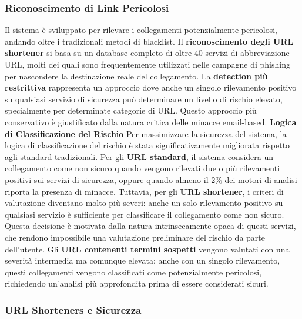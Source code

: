 \documentclass{article}
\begin{document}
\subsubsection{Riconoscimento di Link Pericolosi}

Il sistema è sviluppato per rilevare i collegamenti potenzialmente pericolosi, andando oltre i tradizionali metodi di blacklist. Il \textbf{riconoscimento degli URL shortener} si basa su un database completo di oltre 40 servizi di abbreviazione URL, molti dei quali sono frequentemente utilizzati nelle campagne di phishing per nascondere la destinazione reale del collegamento.
\newline \newline
La \textbf{detection più restrittiva} rappresenta un approccio dove anche un singolo rilevamento positivo su qualsiasi servizio di sicurezza può determinare un livello di rischio elevato, specialmente per determinate categorie di URL. Questo approccio più conservativo è giustificato dalla natura critica delle minacce email-based.
\newline \newline
\textbf{Logica di Classificazione del Rischio}
\newline
Per massimizzare la sicurezza del sistema, la logica di classificazione del rischio è stata significativamente migliorata rispetto agli standard tradizionali. Per gli \textbf{URL standard}, il sistema considera un collegamento come non sicuro quando vengono rilevati due o più rilevamenti positivi sui servizi di sicurezza, oppure quando almeno il 2\% dei motori di analisi riporta la presenza di minacce.
\newline \newline
Tuttavia, per gli \textbf{URL shortener}, i criteri di valutazione diventano molto più severi: anche un solo rilevamento positivo su qualsiasi servizio è sufficiente per classificare il collegamento come non sicuro. Questa decisione è motivata dalla natura intrinsecamente opaca di questi servizi, che rendono impossibile una valutazione preliminare del rischio da parte dell'utente.
\newline \newline
Gli \textbf{URL contenenti termini sospetti} vengono valutati con una severità intermedia ma comunque elevata: anche con un singolo rilevamento, questi collegamenti vengono classificati come potenzialmente pericolosi, richiedendo un'analisi più approfondita prima di essere considerati sicuri.

\subsubsection{URL Shorteners e Sicurezza}
\end{document}
